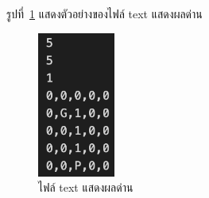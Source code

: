 รูปที่~\ref{ft1} แสดงตัวอย่างของไฟล์ text แสดงผลด่าน
\begin{figure}[h!]
    \begin{center}
    \includegraphics[width=1in]{pic-toro/filetext1.png}
    \end{center}
    \caption[ไฟล์ text แสดงผลด่าน]{ไฟล์ text แสดงผลด่าน}
    \label{ft1}
    \end{figure}

